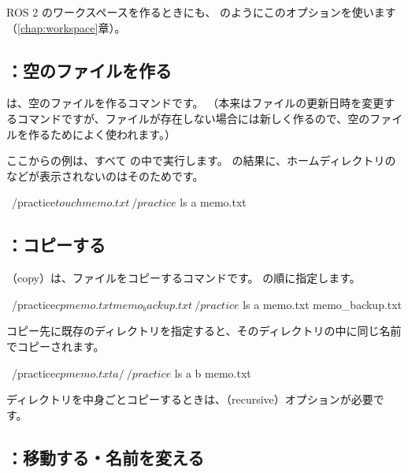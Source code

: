 ROS 2 のワークスペースを作るときにも、 のようにこのオプションを使います（\ref{chap:workspace}章）。

\subsection{：空のファイルを作る}

 は、空のファイルを作るコマンドです。
（本来はファイルの更新日時を変更するコマンドですが、ファイルが存在しない場合には新しく作るので、空のファイルを作るためによく使われます。）

ここからの例は、すべて  の中で実行します。
 の結果に、ホームディレクトリの  などが表示されないのはそのためです。

\begin{terminal}[空のファイルを作る]
~/practice$ touch memo.txt
~/practice$ ls
a  memo.txt
\end{terminal}

\subsection{：コピーする}

（copy）は、ファイルをコピーするコマンドです。
 の順に指定します。

\begin{terminal}[ファイルをコピーする]
~/practice$ cp memo.txt memo_backup.txt
~/practice$ ls
a  memo.txt  memo_backup.txt
\end{terminal}

コピー先に既存のディレクトリを指定すると、そのディレクトリの中に同じ名前でコピーされます。

\begin{terminal}[ディレクトリの中にコピーする]
~/practice$ cp memo.txt a/
~/practice$ ls a
b  memo.txt
\end{terminal}

ディレクトリを中身ごとコピーするときは、（recursive）オプションが必要です。


\subsection{：移動する・名前を変える}

